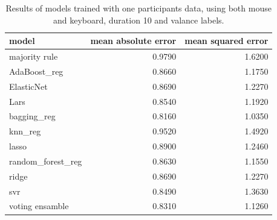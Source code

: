 \begin{table}[!h]
    \centering
    \begin{tabular}{lrr}
        \toprule
                     model &  mean absolute error &  mean squared error \\
        \midrule
             majority rule &               0.9790 &              1.6200 \\
              AdaBoost\_reg &               0.8660 &              1.1750 \\
                ElasticNet &               0.8690 &              1.2270 \\
                      Lars &               0.8540 &              1.1920 \\
               bagging\_reg &               0.8160 &              1.0350 \\
                   knn\_reg &               0.9520 &              1.4920 \\
                     lasso &               0.8900 &              1.2460 \\
         random\_forest\_reg &               0.8630 &              1.1550 \\
                     ridge &               0.8690 &              1.2270 \\
                       svr &               0.8490 &              1.3630 \\
           voting ensamble &               0.8310 &              1.1260 \\
        \bottomrule
    \end{tabular}
    \caption{Results of models trained with one participants data, using both mouse and keyboard, duration 10 and valance labels.}             
\end{table}

